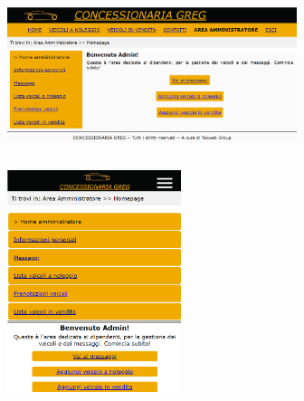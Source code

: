         \begin{center}
            \includegraphics[width=20pc, height=12pc]{./img/AreaAmministratoreDesktop.png} \includegraphics[width=12pc, height=16pc]{./img/AreaAmministratoreMobile.png}
        \end{center}

    

